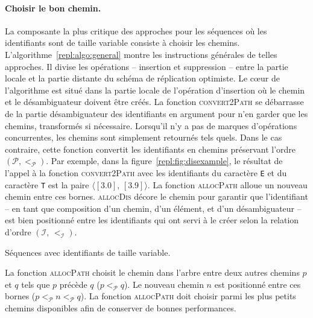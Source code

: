 
\paragraph{Choisir le bon chemin.} La composante la plus critique des approches
pour les séquences où les identifiants sont de taille variable consiste à
choisir les chemins. L'algorithme~\ref{repl:algo:general} montre les
instructions générales de telles approches. Il divise les opérations --
insertion et suppression -- entre la partie locale et la partie distante du
schéma de réplication optimiste. Le cœur de l'algorithme est situé dans la
partie locale de l'opération d'insertion où le chemin et le désambiguateur
doivent être créés. La fonction \textsc{convert2Path} se débarrasse de la partie
désambiguateur des identifiants en argument pour n'en garder que les chemins,
transformés si nécessaire. Lorsqu'il n'y a pas de marques d'opérations
concurrentes, les chemins sont simplement retournés tels quels. Dans le cas
contraire, cette fonction convertit les identifiants en chemins préservant
l'ordre $(\mathcal{P}, <_\mathcal{P})$. Par exemple, dans la
figure~\ref{repl:fig:disexample}, le résultat de l'appel à la fonction
\textsc{convert2Path} avec les identifiants du caractère \texttt{E} et du
caractère \texttt{T} est la paire $\langle [3.0],\, [3.9] \rangle$. La fonction
\textsc{allocPath} alloue un nouveau chemin entre ces bornes. \textsc{allocDis}
décore le chemin pour garantir que l'identifiant -- en tant que composition d'un
chemin, d'un élément, et d'un désambiguateur -- est bien positionné entre les
identifiants qui ont servi à le créer selon la relation d'ordre
$(\mathcal{I},\, <_\mathcal{I})$.

\begin{algorithm}[h]
  
  \caption[Séquences avec identifiants de taille variable]
  {\label{repl:algo:general}Séquences avec identifiants de taille variable.}
\end{algorithm}

La fonction \textsc{allocPath} choisit le chemin dans l'arbre entre deux autres
chemins $p$ et $q$ tels que $p$ précède $q$ ($p <_\mathcal{P} q$). Le nouveau
chemin $n$ est positionné entre ces bornes
($p <_\mathcal{P} n <_\mathcal{P} q$). La fonction \textsc{allocPath} doit
choisir parmi les plus petits chemins disponibles afin de conserver de bonnes
performances.

